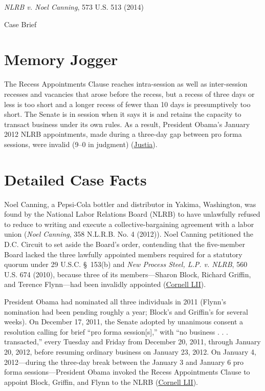 \documentclass[12pt]{article}
\begin{document}
\begin{center}
{\LARGE \textit{NLRB v. Noel Canning}, 573 U.S. 513 (2014)\par}
\vspace{0.8em}
{\large Case Brief\par}
\end{center}
\vspace{1em}

\section{Memory Jogger}
The Recess Appointments Clause reaches intra-session as well as inter-session recesses and vacancies that arose before the recess, but a recess of three days or less is too short and a longer recess of fewer than 10 days is presumptively too short. The Senate is in session when it says it is and retains the capacity to transact business under its own rules. As a result, President Obama's January 2012 NLRB appointments, made during a three-day gap between pro forma sessions, were invalid (9--0 in judgment) (\href{https://supreme.justia.com/cases/federal/us/573/513/}{Justia}).

\section{Detailed Case Facts}
Noel Canning, a Pepsi-Cola bottler and distributor in Yakima, Washington, was found by the National Labor Relations Board (NLRB) to have unlawfully refused to reduce to writing and execute a collective-bargaining agreement with a labor union (\emph{Noel Canning}, 358 N.L.R.B. No. 4 (2012)). Noel Canning petitioned the D.C. Circuit to set aside the Board's order, contending that the five-member Board lacked the three lawfully appointed members required for a statutory quorum under 29 U.S.C. \S~153(b) and \emph{New Process Steel, L.P. v. NLRB}, 560 U.S. 674 (2010), because three of its members---Sharon Block, Richard Griffin, and Terence Flynn---had been invalidly appointed (\href{https://www.law.cornell.edu/supremecourt/text/12-1281}{Cornell LII}).

President Obama had nominated all three individuals in 2011 (Flynn's nomination had been pending roughly a year; Block's and Griffin's for several weeks). On December 17, 2011, the Senate adopted by unanimous consent a resolution calling for brief ``pro forma session[s],'' with ``no business . . . transacted,'' every Tuesday and Friday from December 20, 2011, through January 20, 2012, before resuming ordinary business on January 23, 2012. On January 4, 2012---during the three-day break between the January 3 and January 6 pro forma sessions---President Obama invoked the Recess Appointments Clause to appoint Block, Griffin, and Flynn to the NLRB (\href{https://www.law.cornell.edu/supremecourt/text/12-1281}{Cornell LII}).
\end{document}
